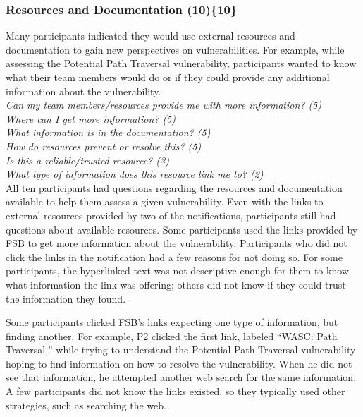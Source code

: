 \documentclass[10pt,journal,compsoc]{IEEEtran}
\begin{document}
\subsubsection{Resources and Documentation (10)\{10\}}

\label{rd}
Many participants indicated they would use external resources and documentation to gain new perspectives on vulnerabilities.
For example, while assessing the Potential Path Traversal vulnerability, participants wanted to know what their team members would do or if they could provide any additional information about the vulnerability. 
\\

\noindent\emph{Can my team members/resources provide me with more information? (5)} \\
\emph{Where can I get more information? (5)} \\
\emph{What information is in the documentation? (5)} \\
\emph{How do resources prevent or resolve this? (5)} \\
\emph{Is this a reliable/trusted resource? (3)} \\
\emph{What type of information does this resource link me to? (2)}
\\
 
All ten participants had questions regarding the resources and documentation available to help them assess a given vulnerability. 
Even with the links to external resources provided by two of the notifications, participants still had questions about available resources. 
Some participants used the links provided by FSB to get more information about the vulnerability.
Participants who did not click the links in the notification had a few reasons for not doing so.
For some participants, the hyperlinked text was not descriptive enough for them to know what information the link was offering; others did not know if they could trust the information they found.

Some participants clicked FSB's links expecting one type of information, but finding another. 
For example, P2 clicked the first link, labeled ``WASC: Path Traversal,'' while trying to understand the Potential Path Traversal vulnerability hoping to find information on how to resolve the vulnerability.
When he did not see that information, he attempted another web search for the same information. 
A few participants did not know the links existed, so they typically used other strategies, such as searching the web.
\end{document}
